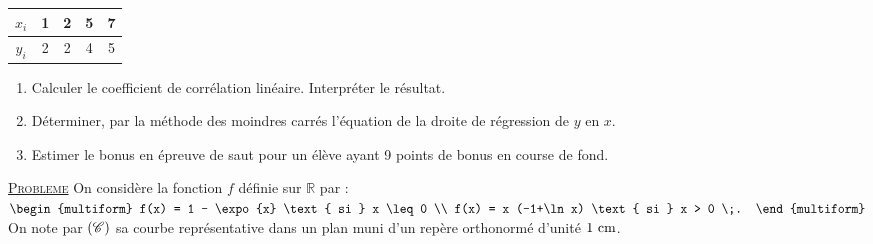 \begin{description}
                        \begin{tabular}{|c|c|c|c|c|}
                              \hline
                              $x_i$ & 1 & 2 & 5 & 7 \\
                              \hline
                              $y_i$ & 2 & 2 & 4 & 5 \\
                              \hline
                        \end{tabular}
                  \begin{enumerate}
                        \item Calculer le coefficient de corr\'elation lin\'eaire. Interpr\'eter le r\'esultat.
                        \item D\'eterminer, par la m\'ethode des moindres carr\'es l'\'equation de la droite
                              de r\'egression de $y$ en $x$.
                        \item Estimer le bonus en \'epreuve de saut pour un \'el\`eve ayant 9 points de bonus en course de fond.
                  \end{enumerate}
      \end{description}
\noindent \underline{\textsc{Probleme}} \newline
      On consid\`ere la fonction $f$ d\'efinie sur $\mathbb{R}$ par : 
      $ \begin{multiform}
            f(x) = 1 - \expo{x}   \text{ si } x \leq 0 \\ 
            f(x) = x (-1+\ln x)   \text{ si } x > 0    \;.
      \end{multiform} $ \newline
      On note par $(\mathscr{C})$ sa courbe repr\'esentative dans un plan muni d'un rep\`ere orthonorm\'e \Oij{} d'unit\'e $1~\mathrm{cm}$.
